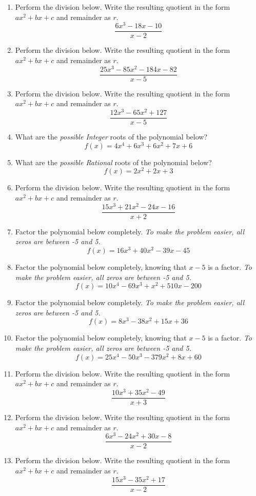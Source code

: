 \documentclass[14pt]{extbook}
\begin{document}
\begin{enumerate}
\item{
Perform the division below. Write the resulting quotient in the form $ax^2+bx+c$ and remainder as $r$.\[ \frac{6x^{3} -18 x -10}{x -2} \]} \newpage
\item{
Perform the division below. Write the resulting quotient in the form $ax^2+bx+c$ and remainder as $r$.\[ \frac{25x^{3} -85 x^{2} -184 x -82}{x -5} \]} \newpage
\item{
Perform the division below. Write the resulting quotient in the form $ax^2+bx+c$ and remainder as $r$.\[ \frac{12x^{3} -65 x^{2} + 127}{x -5} \]} \newpage
\item{
What are the \textit{possible Integer} roots of the polynomial below?\[ f(x) = 4x^{4} +6 x^{3} +6 x^{2} +7 x + 6 \]} \newpage
\item{
What are the \textit{possible Rational} roots of the polynomial below?\[ f(x) = 2x^{2} +2 x + 3 \]} \newpage
\item{
Perform the division below. Write the resulting quotient in the form $ax^2+bx+c$ and remainder as $r$.\[ \frac{15x^{3} +21 x^{2} -24 x -16}{x + 2} \]} \newpage
\item{
Factor the polynomial below completely. \textit{To make the problem easier, all zeros are between -5 and 5.}\[ f(x) = 16x^{3} +40 x^{2} -39 x -45 \]} \newpage
\item{
Factor the polynomial below completely, knowing that $x -5$ is a factor. \textit{To make the problem easier, all zeros are between -5 and 5.}\[ f(x) = 10x^{4} -69 x^{3} + x^{2} +510 x -200 \]} \newpage
\item{
Factor the polynomial below completely. \textit{To make the problem easier, all zeros are between -5 and 5.}\[ f(x) = 8x^{3} -38 x^{2} +15 x + 36 \]} \newpage
\item{
Factor the polynomial below completely, knowing that $x -5$ is a factor. \textit{To make the problem easier, all zeros are between -5 and 5.}\[ f(x) = 25x^{4} -50 x^{3} -379 x^{2} +8 x + 60 \]} \newpage
\item{
Perform the division below. Write the resulting quotient in the form $ax^2+bx+c$ and remainder as $r$.\[ \frac{10x^{3} +35 x^{2} -49}{x + 3} \]} \newpage
\item{
Perform the division below. Write the resulting quotient in the form $ax^2+bx+c$ and remainder as $r$.\[ \frac{6x^{3} -24 x^{2} +30 x -8}{x -2} \]} \newpage
\item{
Perform the division below. Write the resulting quotient in the form $ax^2+bx+c$ and remainder as $r$.\[ \frac{15x^{3} -35 x^{2} + 17}{x -2} \]} \newpage

\end{enumerate}
\end{document}
